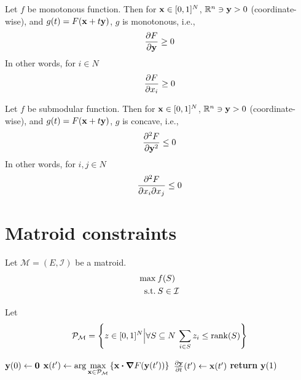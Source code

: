 
\begin{prop}
	Let $f$ be monotonous function. Then for $\vb{x}\in [0,1]^N$, $\mathbb{R}^n \ni \vb{y}>0$ (coordinate-wise), and $g(t)=F(\vb{x}+t\vb{y})$, $g$ is monotonous, i.e., 
	\begin{align}
	\pdv{F}{\vb{y}}\geq 0
	\end{align}
	In other words, for $i\in N$
	\begin{align}
	\pdv{F}{x_i} \geq  0
	\end{align}
\end{prop}
\begin{prop}
	Let $f$ be submodular function. Then for $\vb{x}\in [0,1]^N$, $\mathbb{R}^n \ni \vb{y}>0$ (coordinate-wise), and $g(t)=F(\vb{x}+t\vb{y})$, $g$ is concave, i.e., 
	\begin{align}
	\pdv[2]{F}{\vb{y}}\leq 0
	\end{align}
	In other words, for $i,j\in N$
	\begin{align}
	\pdv{F}{x_i}{x_j}\leq 0
	\end{align}
\end{prop}

\section{Matroid constraints}
Let $\mathcal{M}=(E,\mathcal{I})$ be a matroid.
\begin{align}
\max \: & f(S)\\
\text{s.t.} \: & S\in \mathcal{I}
\end{align}

Let 
\begin{align}
\mathcal{P}_\mathcal{M} = \qty{z\in [0,1]^N \Big\vert \forall S\subseteq N \: \sum_{i \in S}z_i\leq \rank(S)}
\end{align}

\begin{algorithm}
	\caption{}\label{alg:cont_greedy}
	\begin{algorithmic}[1]
		\State $\vb{y}(0) \gets \vb{0}$
		\State $\vb{x}(t') \gets \arg \max\limits_{\vb{x} \in \mathcal{P}_\mathcal{M}} \qty{\vb{x}\vdot \grad{F\qty(\vb{y}(t'))}} $
		\State $\pdv{\vb{y}}{t}\qty(t') \gets \vb{x}(t') $
		\EndFor
		\State \textbf{return} $\vb{y}(1)$
		\EndProcedure
	\end{algorithmic}
\end{algorithm}

